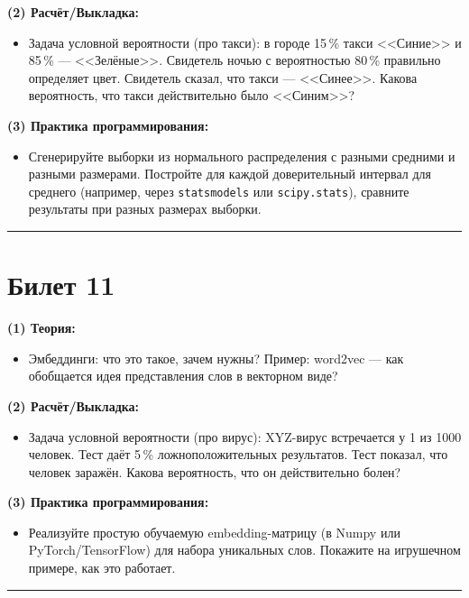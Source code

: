\documentclass[a4paper,12pt]{article}
\begin{document}
\textbf{(2) Расчёт/Выкладка:}
\begin{itemize}
  \item Задача условной вероятности (про такси): в городе 15\,\% такси <<Синие>> и 85\,\% --- <<Зелёные>>. Свидетель ночью с вероятностью 80\,\% правильно определяет цвет. Свидетель сказал, что такси --- <<Синее>>. Какова вероятность, что такси действительно было <<Синим>>?
\end{itemize}

\textbf{(3) Практика программирования:}
\begin{itemize}
  \item Сгенерируйте выборки из нормального распределения с разными средними и разными размерами. Постройте для каждой доверительный интервал для среднего (например, через \texttt{statsmodels} или \texttt{scipy.stats}), сравните результаты при разных размерах выборки.
\end{itemize}

\noindent\rule{\textwidth}{0.4pt}
\newpage

\section*{Билет 11}
\textbf{(1) Теория:}
\begin{itemize}
  \item Эмбеддинги: что это такое, зачем нужны? Пример: word2vec --- как обобщается идея представления слов в векторном виде?
\end{itemize}

\textbf{(2) Расчёт/Выкладка:}
\begin{itemize}
  \item Задача условной вероятности (про вирус): XYZ-вирус встречается у 1 из 1000 человек. Тест даёт 5\,\% ложноположительных результатов. Тест показал, что человек заражён. Какова вероятность, что он действительно болен?
\end{itemize}

\textbf{(3) Практика программирования:}
\begin{itemize}
  \item Реализуйте простую обучаемую embedding-матрицу (в Numpy или PyTorch/TensorFlow) для набора уникальных слов. Покажите на игрушечном примере, как это работает.
\end{itemize}

\noindent\rule{\textwidth}{0.4pt}
\newpage

\end{document}
